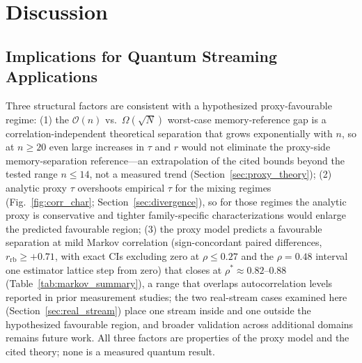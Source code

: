 \documentclass[sensors,article,submit,pdftex,moreauthors]{Definitions/mdpi}
\newcommand{\bigO}{\mathcal{O}}
\providecommand{\DIFadd}[1]{{\protect\color{blue}#1}} %
\providecommand{\DIFdel}[1]{} %
\providecommand{\DIFaddbegin}{} %
\providecommand{\DIFaddend}{} %
\providecommand{\DIFdelbegin}{} %
\providecommand{\DIFdelend}{} %
\begin{document}
\section{Discussion}
\label{sec:discussion}

\subsection{Implications for Quantum Streaming Applications}

Three structural factors are consistent with a \DIFdelbegin \DIFdel{favourable proxy-estimated }\DIFdelend \DIFaddbegin \DIFadd{hypothesized proxy-favourable }\DIFaddend regime: (1) the $\bigO(n)$ vs.\ $\Omega(\sqrt{N})$ worst-case memory-reference gap is \DIFdelbegin \DIFdel{independent of correlation and }\DIFdelend \DIFaddbegin \DIFadd{a correlation-independent theoretical separation that }\DIFaddend grows exponentially with $n$, so at $n \geq 20$ even large increases in $\tau$ and $r$ \DIFdelbegin \DIFdel{do }\DIFdelend \DIFaddbegin \DIFadd{would }\DIFaddend not eliminate the proxy-side memory-separation \DIFdelbegin \DIFdel{reference}\DIFdelend \DIFaddbegin \DIFadd{reference---an extrapolation of the cited bounds beyond the tested range $n \leq 14$, not a measured trend (Section~\ref{sec:proxy_theory})}\DIFaddend ; (2) analytic proxy $\tau$ \DIFdelbegin \DIFdel{systematically }\DIFdelend overshoots empirical $\tau$ \DIFaddbegin \DIFadd{for the mixing regimes }\DIFaddend (Fig.~\ref{fig:corr_char}\DIFaddbegin \DIFadd{; Section~\ref{sec:divergence}}\DIFaddend ), so \DIFdelbegin \DIFdel{the proxy model }\DIFdelend \DIFaddbegin \DIFadd{for those regimes the analytic proxy }\DIFaddend is conservative and tighter family-specific characterizations would enlarge the predicted favourable region; (3) the proxy \DIFaddbegin \DIFadd{model }\DIFaddend predicts a favourable separation at \DIFdelbegin \DIFdel{$\rho \leq 0.47$ ($p \leq 0.049$) and the proxy-model crossover occurs near $\rho \approx 0.88$ ($p = 0.037$; }\DIFdelend \DIFaddbegin \DIFadd{mild Markov correlation (sign-concordant paired differences, $r_{\mathrm{rb}} \geq +0.71$, with exact CIs excluding zero at $\rho \leq 0.27$ and the $\rho = 0.48$ interval one estimator lattice step from zero) that closes at $\rho^{*} \approx 0.82$--$0.88$ (}\DIFaddend Table~\ref{tab:markov_summary}), \DIFdelbegin \DIFdel{which overlaps autocorrelation ranges }\DIFdelend \DIFaddbegin \DIFadd{a range that overlaps autocorrelation levels }\DIFaddend reported in prior measurement studies; the two real-stream cases examined here (Section~\ref{sec:real_stream}) place one stream inside and one outside the \DIFdelbegin \DIFdel{proxy-favourable }\DIFdelend \DIFaddbegin \DIFadd{hypothesized favourable }\DIFaddend region, and broader validation across additional domains remains future work. \DIFaddbegin \DIFadd{All three factors are properties of the proxy model and the cited theory; none is a measured quantum result.
}\DIFaddend 
\end{document}

